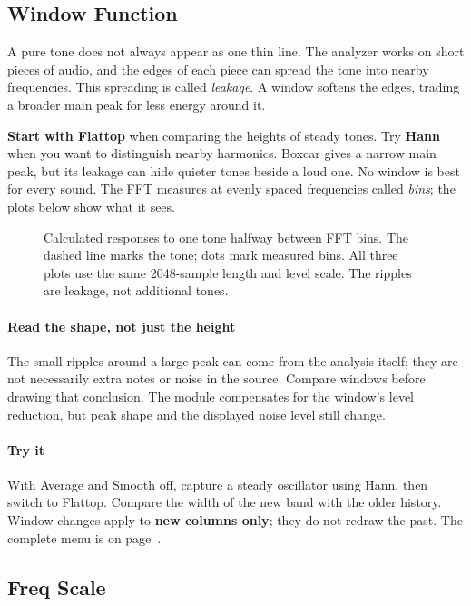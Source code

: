 \clearpage
\subsection{Window Function}
A pure tone does not always appear as one thin line. The analyzer works on
short pieces of audio, and the edges of each piece can spread the tone into
nearby frequencies. This spreading is called \textit{leakage}. A window
softens the edges, trading a broader main peak for less energy around it.

\textbf{Start with Flattop} when comparing the heights of steady tones.
Try \textbf{Hann} when you want to distinguish nearby harmonics. Boxcar gives
a narrow main peak, but its leakage can hide quieter tones beside a loud one.
No window is best for every sound. The FFT measures at evenly spaced
frequencies called \textit{bins}; the plots below show what it sees.

\begin{figure}[!htp]
\centering

\caption{Calculated responses to one tone halfway between FFT bins.
The dashed line marks the tone; dots mark measured bins. All three plots use
the same 2048-sample length and level scale. The ripples are leakage, not
additional tones.}
\end{figure}

\paragraph{Read the shape, not just the height}
The small ripples around a large peak can come from the analysis itself;
they are not necessarily extra notes or noise in the source. Compare windows
before drawing that conclusion. The module compensates for the window's
level reduction, but peak shape and the displayed noise level still change.

\paragraph{Try it}
With Average and Smooth off, capture a steady oscillator using Hann, then
switch to Flattop. Compare the width of the new band with the older history.
Window changes apply to \textbf{new columns only}; they do not redraw the
past. The complete menu is on page~\pageref{sec:control-values}.

\clearpage
\subsection{Freq Scale}

